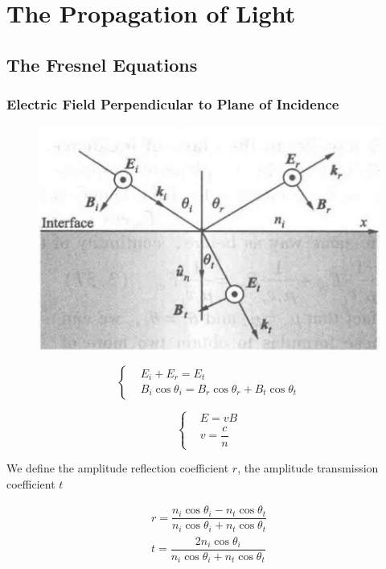 \chapter{The Propagation of Light}

\section{The Fresnel Equations}

\subsection{Electric Field Perpendicular to Plane of Incidence}

\begin{figure}[H]
  \centering
  \includegraphics[width=0.5\linewidth]{figures/Fresnel-perpendicular}
  \label{fig:}
\end{figure}

\begin{equation*}
 \left\{
  \begin{aligned}
    & E_i + E_r = E_t \\
    & B_i \cos \theta_i = B_r \cos \theta_r + B_t \cos \theta_t
  \end{aligned}
  \right.
\end{equation*}

\begin{equation*}
  \left\{
  \begin{aligned}
    & E = v B \\
    & v = \dfrac{c}{n}
  \end{aligned}
  \right.
\end{equation*}

We define the amplitude reflection coefficient $r$, the amplitude transmission coefficient $t$

\begin{equation*}
  \begin{aligned}
    r = \dfrac{n_i \cos \theta_i - n_t \cos \theta_t}{n_i \cos \theta_i + n_t \cos \theta_t} \\
    t = \dfrac{2 n_i \cos \theta_i}{n_i \cos \theta_i + n_t \cos \theta_t} 
  \end{aligned}
\end{equation*}

